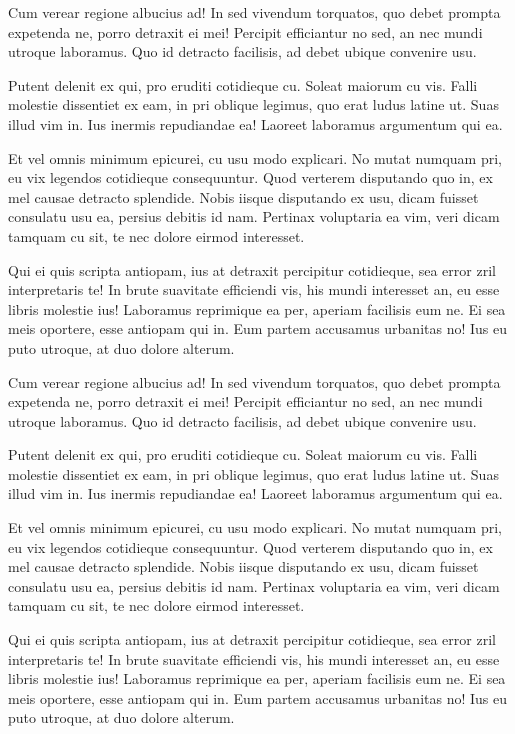 Cum verear regione albucius ad! In sed vivendum torquatos, quo debet prompta
expetenda ne, porro detraxit ei mei! Percipit efficiantur no sed, an nec mundi
utroque laboramus. Quo id detracto facilisis, ad debet ubique convenire usu.

Putent delenit ex qui, pro eruditi cotidieque cu. Soleat maiorum cu vis. Falli
molestie dissentiet ex eam, in pri oblique legimus, quo erat ludus latine ut.
Suas illud vim in. Ius inermis repudiandae ea! Laoreet laboramus argumentum qui
ea.

Et vel omnis minimum epicurei, cu usu modo explicari. No mutat numquam pri, eu
vix legendos cotidieque consequuntur. Quod verterem disputando quo in, ex mel
causae detracto splendide. Nobis iisque disputando ex usu, dicam fuisset
consulatu usu ea, persius debitis id nam. Pertinax voluptaria ea vim, veri dicam
tamquam cu sit, te nec dolore eirmod interesset.

Qui ei quis scripta antiopam, ius at detraxit percipitur cotidieque, sea error
zril interpretaris te! In brute suavitate efficiendi vis, his mundi interesset
an, eu esse libris molestie ius! Laboramus reprimique ea per, aperiam facilisis
eum ne. Ei sea meis oportere, esse antiopam qui in. Eum partem accusamus
urbanitas no! Ius eu puto utroque, at duo dolore alterum.

Cum verear regione albucius ad! In sed vivendum torquatos, quo debet prompta
expetenda ne, porro detraxit ei mei! Percipit efficiantur no sed, an nec mundi
utroque laboramus. Quo id detracto facilisis, ad debet ubique convenire usu.

Putent delenit ex qui, pro eruditi cotidieque cu. Soleat maiorum cu vis. Falli
molestie dissentiet ex eam, in pri oblique legimus, quo erat ludus latine ut.
Suas illud vim in. Ius inermis repudiandae ea! Laoreet laboramus argumentum qui
ea.

Et vel omnis minimum epicurei, cu usu modo explicari. No mutat numquam pri, eu
vix legendos cotidieque consequuntur. Quod verterem disputando quo in, ex mel
causae detracto splendide. Nobis iisque disputando ex usu, dicam fuisset
consulatu usu ea, persius debitis id nam. Pertinax voluptaria ea vim, veri dicam
tamquam cu sit, te nec dolore eirmod interesset.

Qui ei quis scripta antiopam, ius at detraxit percipitur cotidieque, sea error
zril interpretaris te! In brute suavitate efficiendi vis, his mundi interesset
an, eu esse libris molestie ius! Laboramus reprimique ea per, aperiam facilisis
eum ne. Ei sea meis oportere, esse antiopam qui in. Eum partem accusamus
urbanitas no! Ius eu puto utroque, at duo dolore alterum.

